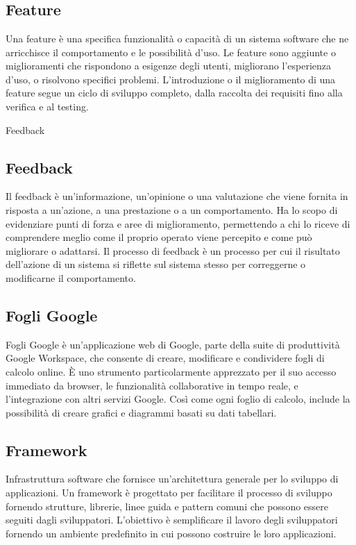 \newpage



\section{}

\hypertarget{sec:feature}{}
\subsection*{Feature}
Una feature è una specifica funzionalità o capacità di un sistema software che ne arricchisce il comportamento e le possibilità d'uso. Le feature sono 
aggiunte o miglioramenti che rispondono a esigenze degli utenti, migliorano l’esperienza d’uso, o risolvono specifici problemi. L'introduzione o il 
miglioramento di una feature segue un ciclo di sviluppo completo, dalla raccolta dei requisiti fino alla verifica e al testing.

\hypertarget{sec:feedback}{Feedback}
\subsection*{Feedback}
Il feedback è un'informazione, un'opinione o una valutazione che viene fornita in risposta a un'azione, a una prestazione o a un 
comportamento. Ha lo scopo di evidenziare punti di forza e aree di miglioramento, permettendo a chi lo riceve di comprendere meglio come il 
proprio operato viene percepito e come può migliorare o adattarsi. Il processo di feedback è un processo per cui il risultato dell’azione 
di un sistema si riflette sul sistema stesso per correggerne o modificarne il comportamento.

\subsection*{Fogli Google}
Fogli Google è un'applicazione web di Google, parte della suite di produttività Google Workspace, che consente di creare, modificare e condividere fogli 
di calcolo online. È uno strumento particolarmente apprezzato per il suo accesso immediato da browser, le funzionalità collaborative in tempo reale, e 
l'integrazione con altri servizi Google. Così come ogni foglio di calcolo, include la possibilità di creare grafici e diagrammi basati su dati tabellari.

\hypertarget{sec:framework}{}
\subsection*{Framework}
Infrastruttura software che fornisce un’architettura generale per lo sviluppo di applicazioni. Un framework è progettato per facilitare il processo di 
sviluppo fornendo strutture, librerie, linee guida e pattern comuni che possono essere seguiti dagli sviluppatori. L’obiettivo è semplificare il lavoro 
degli sviluppatori fornendo un ambiente predefinito in cui possono costruire le loro applicazioni.

